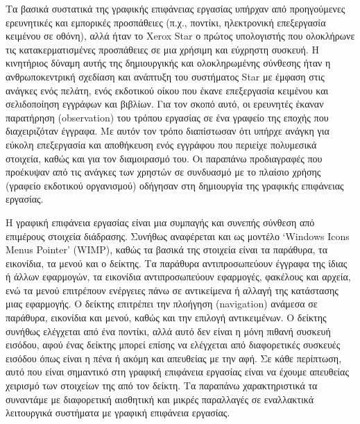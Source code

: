 \documentclass[
]{article}
\begin{document}
Τα βασικά συστατικά της γραφικής επιφάνειας εργασίας υπήρχαν από
προηγούμενες ερευνητικές και εμπορικές προσπάθειες (π.χ., ποντίκι,
ηλεκτρονική επεξεργασία κειμένου σε οθόνη), αλλά ήταν το Xerox Star ο
πρώτος υπολογιστής που ολοκλήρωνε τις κατακερματισμένες προσπάθειες σε
μια χρήσιμη και εύχρηστη συσκευή. Η κινητήριος δύναμη αυτής της
δημιουργικής και ολοκληρωμένης σύνθεσης ήταν η ανθρωποκεντρική σχεδίαση
και ανάπτυξη του συστήματος Star με έμφαση στις ανάγκες ενός πελάτη,
ενός εκδοτικού οίκου που έκανε επεξεργασία κειμένου και σελιδοποίηση
εγγράφων και βιβλίων. Για τον σκοπό αυτό, οι ερευνητές έκαναν παρατήρηση
(observation) του τρόπου εργασίας σε ένα γραφείο της εποχής που
διαχειριζόταν έγγραφα. Με αυτόν τον τρόπο διαπίστωσαν ότι υπήρχε ανάγκη
για εύκολη επεξεργασία και αποθήκευση ενός εγγράφου που περιείχε
πολυμεσικά στοιχεία, καθώς και για τον διαμοιρασμό του. Οι παραπάνω
προδιαγραφές που προέκυψαν από τις ανάγκες των χρηστών σε συνδυασμό με
το πλαίσιο χρήσης (γραφείο εκδοτικού οργανισμού) οδήγησαν στη δημιουργία
της γραφικής επιφάνειας εργασίας.

Η γραφική επιφάνεια εργασίας είναι μια συμπαγής και συνεπής σύνθεση από
επιμέρους στοιχεία διάδρασης. Συνήθως αναφέρεται και ως μοντέλο `Windows
Icons Menus Pointer' (WIMP), καθώς τα βασικά της στοιχεία είναι τα
παράθυρα, τα εικονίδια, τα μενού και ο δείκτης. Τα παράθυρα
αντιπροσωπεύουν έγγραφα της ίδιας ή άλλων εφαρμογών, τα εικονίδια
αντιπροσωπεύουν εφαρμογές, φακέλους και αρχεία, ενώ τα μενού επιτρέπουν
ενέργειες πάνω σε αντικείμενα ή αλλαγή της κατάστασης μιας εφαρμογής. Ο
δείκτης επιτρέπει την πλοήγηση (navigation) ανάμεσα σε παράθυρα,
εικονίδια και μενού, καθώς και την επιλογή αντικειμένων. Ο δείκτης
συνήθως ελέγχεται από ένα ποντίκι, αλλά αυτό δεν είναι η μόνη πιθανή
συσκευή εισόδου, αφού ένας δείκτης μπορεί επίσης να ελέγχεται από
διαφορετικές συσκευές εισόδου όπως είναι η πένα ή ακόμη και απευθείας με
την αφή. Σε κάθε περίπτωση, αυτό που είναι σημαντικό στη γραφική
επιφάνεια εργασίας είναι να έχουμε απευθείας χειρισμό των στοιχείων της
από τον δείκτη. Τα παραπάνω χαρακτηριστικά τα συναντάμε με διαφορετική
αισθητική και μικρές παραλλαγές σε εναλλακτικά λειτουργικά συστήματα με
γραφική επιφάνεια εργασίας.
\end{document}
